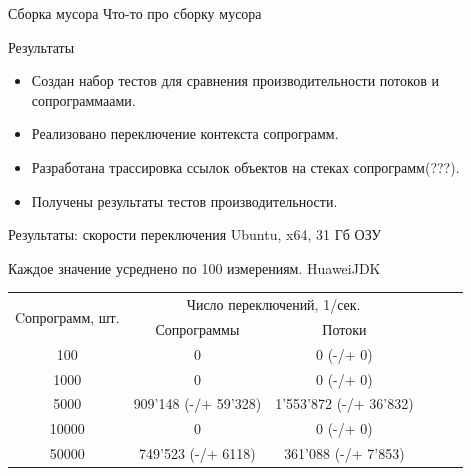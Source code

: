 \begin{frame}{Сборка мусора}
	Что-то про сборку мусора
\end{frame}	
	
\begin{frame}{Результаты}
	\begin{itemize}
	\item Создан набор тестов для сравнения производительности потоков и сопрограммаами.
	\item Реализовано переключение контекста сопрограмм.
	\item Разработана трассировка ссылок объектов на стеках сопрограмм(???).
	\item Получены результаты тестов производительности.
	\end{itemize}
\end{frame}

\begin{frame}{Результаты: скорости переключения}
	Ubuntu, x64, 31 Гб ОЗУ
	\par Каждое значение усреднено по 100 измерениям. HuaweiJDK
	\begin{table}[H]
		\begin{tabular}{|c|c|c|c|c|c|}
			\hline \multirow{2}{*}{Cопрограмм, шт.} & \multicolumn{2}{|c|}{Число переключений, 1/сек.}    \\
			\cline{2-3}    & Сопрограммы          & Потоки               \\%
			\hline 100     & 0                    & 0 (-/+ 0)\\%
			\hline 1000    & 0                    & 0 (-/+ 0)\\%
			\hline 5000    & 909'148 (-/+ 59'328) & 1'553'872 (-/+ 36'832)\\%
			\hline 10000   & 0                    & 0 (-/+ 0)\\%
			\hline 50000   & 749'523 (-/+ 6118)   & 361'088 (-/+ 7'853)\\%
			\hline 
		\end{tabular}
	\end{table}
	
\end{frame}

